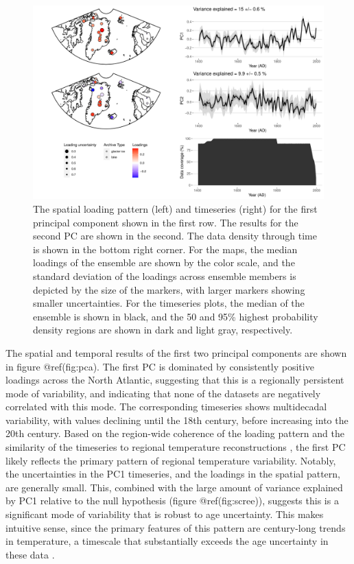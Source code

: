 \documentclass[gchron, manuscript]{copernicus}
\begin{document}
\begin{figure}
\includegraphics[width=12cm]{geoChronR-paper_files/figure-latex/pca-1} \caption{The spatial loading pattern (left) and timeseries (right) for the first principal component shown in the first row. The results for the second PC are shown in the second. The data density through time is shown in the bottom right corner. For the maps, the median loadings of the ensemble are shown by the color scale, and the standard deviation of the loadings across ensemble members is depicted by the size of the markers, with larger markers showing smaller uncertainties. For the timeseries plots, the median of the ensemble is shown in black, and the 50 and 95\% highest probability density regions are shown in dark and light gray, respectively.}\label{fig:pca}
\end{figure}

The spatial and temporal results of the first two principal components
are shown in figure @ref(fig:pca). The first PC is dominated by
consistently positive loadings across the North Atlantic, suggesting
that this is a regionally persistent mode of variability, and indicating
that none of the datasets are negatively correlated with this mode. The
corresponding timeseries shows multidecadal variability, with values
declining until the 18th century, before increasing into the 20th
century. Based on the region-wide coherence of the loading pattern and
the similarity of the timeseries to regional temperature reconstructions
\citep{paico, McKayKaufman2014, werner2018arcticCFR}, the first PC
likely reflects the primary pattern of regional temperature variability.
Notably, the uncertainties in the PC1 timeseries, and the loadings in
the spatial pattern, are generally small. This, combined with the large
amount of variance explained by PC1 relative to the null hypothesis
(figure @ref(fig:scree)), suggests this is a significant mode of
variability that is robust to age uncertainty. This makes intuitive
sense, since the primary features of this pattern are century-long
trends in temperature, a timescale that substantially exceeds the age
uncertainty in these data \citep{McKayKaufman2014}.
\end{document}
